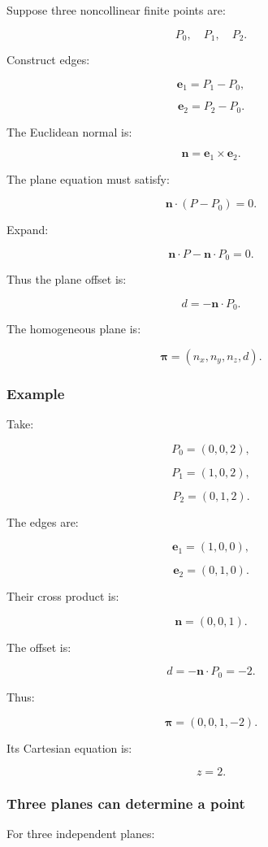 Suppose three noncollinear finite points are:

\[
 P_0,\quad P_1,\quad P_2.
\]

Construct edges:

\[
 \mathbf e_1=P_1-P_0,
\]

\[
 \mathbf e_2=P_2-P_0.
\]

The Euclidean normal is:

\[
 \boxed{ \mathbf n=\mathbf e_1\times\mathbf e_2 }.
\]

The plane equation must satisfy:

\[
 \mathbf n\cdot(P-P_0)=0.
\]

Expand:

\[
 \mathbf n\cdot P-\mathbf n\cdot P_0=0.
\]

Thus the plane offset is:

\[
 \boxed{ d=-\mathbf n\cdot P_0 }.
\]

The homogeneous plane is:

\[
 \boxed{ \boldsymbol\pi= (n_x,n_y,n_z,d) }.
\]

\subsubsection{Example}\label{example}

Take:

\[
 P_0=(0,0,2),
\]

\[
 P_1=(1,0,2),
\]

\[
 P_2=(0,1,2).
\]

The edges are:

\[
 \mathbf e_1=(1,0,0),
\]

\[
 \mathbf e_2=(0,1,0).
\]

Their cross product is:

\[
 \mathbf n=(0,0,1).
\]

The offset is:

\[
 d=-\mathbf n\cdot P_0=-2.
\]

Thus:

\[
 \boxed{ \boldsymbol\pi=(0,0,1,-2) }.
\]

Its Cartesian equation is:

\[
 \boxed{z=2}.
\]

\subsubsection{Three planes can determine a point}\label{three-planes-can-determine-a-point}

For three independent planes:

